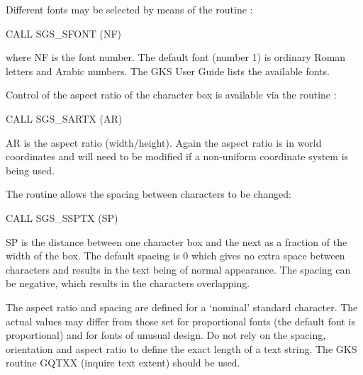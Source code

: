 \documentclass[11pt]{starlink}
\begin{document}
Different fonts may
be selected by means of the routine :
\begin{terminalv}
CALL SGS_SFONT (NF)
\end{terminalv}
where NF is the font number.  The default font (number 1) is ordinary Roman
letters and Arabic numbers.  The GKS User Guide lists the available fonts.

Control of the aspect ratio of the character box is available
via the routine :
\begin{terminalv}
CALL SGS_SARTX (AR)
\end{terminalv}
AR is the aspect ratio (width/height).  Again the aspect ratio is in world
coordinates and will need to be modified if a non-uniform coordinate system
is being used.

The routine 
allows the spacing between characters to be changed:
\begin{terminalv}
CALL SGS_SSPTX (SP)
\end{terminalv}
SP is the distance between one character box and the next as
a fraction of the width of the box.  The default spacing is 0 which
gives no extra space between characters and results in the text being
of normal appearance.  The spacing can be negative, which results in the
characters overlapping.

The aspect ratio and spacing are defined for a `nominal' standard
character.  The actual values may differ from those set for proportional fonts
(the default font is proportional) and for fonts of unusual design.  Do
not rely on the spacing, orientation and aspect ratio to define
the exact length
of a text string.  The GKS routine GQTXX (inquire text extent) should be
used.
\end{document}
